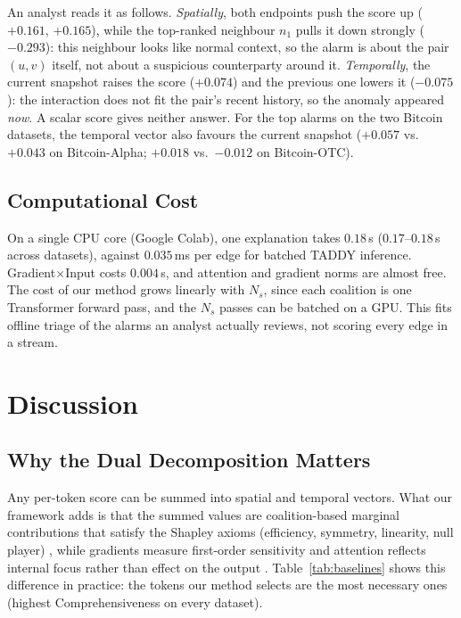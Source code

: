 \documentclass[conference]{IEEEtran}
\begin{document}
An analyst reads it as follows. \emph{Spatially}, both endpoints push the score
up ($+0.161$, $+0.165$), while the top-ranked neighbour $n_1$ pulls it down
strongly ($-0.293$): this neighbour looks like normal context, so the alarm is
about the pair $(u,v)$ itself, not about a suspicious counterparty around it.
\emph{Temporally}, the current snapshot raises the score ($+0.074$) and the
previous one lowers it ($-0.075$): the interaction does not fit the pair's
recent history, so the anomaly appeared \emph{now}. A scalar score gives
neither answer. For the top alarms on the two Bitcoin datasets, the temporal
vector also favours the current snapshot ($+0.057$ vs.\ $+0.043$ on
Bitcoin-Alpha; $+0.018$ vs.\ $-0.012$ on Bitcoin-OTC).

\subsection{Computational Cost}
On a single CPU core (Google Colab), one explanation takes $0.18$\,s
($0.17$--$0.18$\,s across datasets), against $0.035$\,ms per edge for batched
TADDY inference. Gradient$\times$Input costs $0.004$\,s, and attention and
gradient norms are almost free. The cost of our method grows linearly with
$N_s$, since each coalition is one Transformer forward pass, and the $N_s$
passes can be batched on a GPU. This fits offline triage of the alarms an
analyst actually reviews, not scoring every edge in a stream.

\section{Discussion}
\label{sec:discussion}

\subsection{Why the Dual Decomposition Matters}
Any per-token score can be summed into spatial and temporal vectors. What our
framework adds is that the summed values are coalition-based marginal
contributions that satisfy the Shapley axioms (efficiency, symmetry, linearity,
null player) \cite{shapley1953value}, while gradients measure first-order
sensitivity and attention reflects internal focus rather than effect on the
output \cite{jain2019attention}. Table~\ref{tab:baselines} shows this
difference in practice: the tokens our method selects are the most necessary
ones (highest Comprehensiveness on every dataset).
\end{document}
